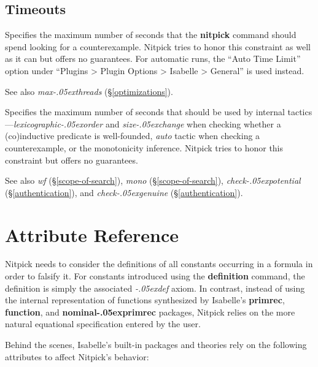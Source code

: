 \documentclass[a4paper,12pt]{article}
\renewcommand\_{\hbox{\textunderscore\kern-.05ex}}
\begin{document}
\subsection{Timeouts}
\label{timeouts}

\begin{enum}
Specifies the maximum number of seconds that the \textbf{nitpick} command should
spend looking for a counterexample. Nitpick tries to honor this constraint as
well as it can but offers no guarantees. For automatic runs, the ``Auto Time
Limit'' option under ``Plugins > Plugin Options > Isabelle > General'' is used
instead.

\nopagebreak
{\small See also \textit{max\_threads} (\S\ref{optimizations}).}

\opdefault{tac\_timeout}{float}{\upshape 0.5}
Specifies the maximum number of seconds that should be used by internal
tactics---\textit{lexicographic\_order} and \textit{size\_change} when checking
whether a (co)in\-duc\-tive predicate is well-founded, \textit{auto} tactic when
checking a counterexample, or the monotonicity inference. Nitpick tries to honor
this constraint but offers no guarantees.

\nopagebreak
{\small See also \textit{wf} (\S\ref{scope-of-search}),
\textit{mono} (\S\ref{scope-of-search}),
\textit{check\_potential} (\S\ref{authentication}),
and \textit{check\_genuine} (\S\ref{authentication}).}
\end{enum}

\section{Attribute Reference}
\label{attribute-reference}

Nitpick needs to consider the definitions of all constants occurring in a
formula in order to falsify it. For constants introduced using the
\textbf{definition} command, the definition is simply the associated
\textit{\_def} axiom. In contrast, instead of using the internal representation
of functions synthesized by Isabelle's \textbf{primrec}, \textbf{function}, and
\textbf{nominal\_primrec} packages, Nitpick relies on the more natural
equational specification entered by the user.

Behind the scenes, Isabelle's built-in packages and theories rely on the
following attributes to affect Nitpick's behavior:
\end{document}

